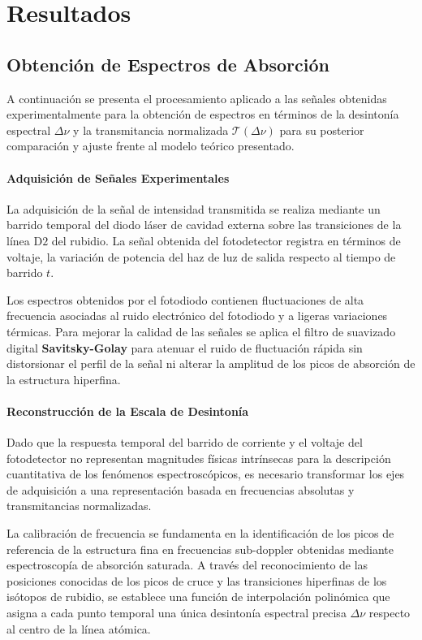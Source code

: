 \chapter{Resultados}
\section{Obtención de Espectros de Absorción}
A continuación se presenta el procesamiento aplicado a las señales obtenidas experimentalmente para la obtención de espectros en términos de la desintonía espectral $\Delta \nu$ y la transmitancia normalizada $\mathscr{T}(\Delta \nu)$ para su posterior comparación y ajuste frente al modelo teórico presentado.
\subsubsection*{Adquisición de Señales Experimentales}
La adquisición de la señal de intensidad transmitida se realiza mediante un barrido temporal del diodo láser de cavidad externa sobre las transiciones de la línea $\text{D2}$ del rubidio. La señal obtenida del fotodetector registra en términos de voltaje, la variación de potencia del haz de luz de salida respecto al tiempo de barrido $t$.

Los espectros obtenidos por el fotodiodo contienen fluctuaciones de alta frecuencia asociadas al ruido electrónico del fotodiodo y a ligeras variaciones térmicas. Para mejorar la calidad de las señales se aplica el filtro de suavizado digital \textbf{Savitsky-Golay} para atenuar el ruido de fluctuación rápida sin distorsionar el perfil de la señal ni alterar la amplitud de los picos de absorción de la estructura hiperfina.

\subsubsection*{Reconstrucción de la Escala de Desintonía}
Dado que la respuesta temporal del barrido de corriente y el voltaje del fotodetector no representan magnitudes físicas intrínsecas para la descripción cuantitativa de los fenómenos espectroscópicos, es necesario transformar los ejes de adquisición a una representación basada en frecuencias absolutas y transmitancias normalizadas.

La calibración de frecuencia se fundamenta en la identificación de los picos de referencia de la estructura fina en frecuencias sub-doppler obtenidas mediante espectroscopía de absorción saturada. A través del reconocimiento de las posiciones conocidas de los picos de cruce y las transiciones hiperfinas de los isótopos de rubidio, se establece una función de interpolación polinómica que asigna a cada punto temporal una única desintonía espectral precisa $\Delta \nu$ respecto al centro de la línea atómica.

